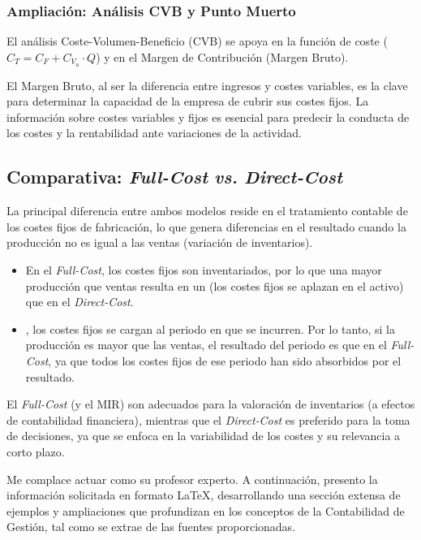 \subsubsection{Ampliación: Análisis CVB y Punto Muerto}

El análisis Coste-Volumen-Beneficio (CVB) se apoya en la función de coste ($C_T = C_F + C_{V_u} \cdot Q$) y en el Margen de Contribución (Margen Bruto).

El Margen Bruto, al ser la diferencia entre ingresos y costes variables, es la clave para determinar la capacidad de la empresa de cubrir sus costes fijos. La información sobre costes variables y fijos es esencial para predecir la conducta de los costes y la rentabilidad ante variaciones de la actividad.

\subsection{Comparativa: \textit{Full-Cost} \textit{vs.} \textit{Direct-Cost}}

La principal diferencia entre ambos modelos reside en el tratamiento contable de los costes fijos de fabricación, lo que genera diferencias en el resultado cuando la producción no es igual a las ventas (variación de inventarios).

\begin{itemize}
    \item {} En el \textit{Full-Cost}, los costes fijos son inventariados, por lo que una mayor producción que ventas resulta en un  (los costes fijos se aplazan en el activo) que en el \textit{Direct-Cost}.
    \item {}, los costes fijos se cargan al periodo en que se incurren. Por lo tanto, si la producción es mayor que las ventas, el resultado del periodo es  que en el \textit{Full-Cost}, ya que todos los costes fijos de ese periodo han sido absorbidos por el resultado.
\end{itemize}

El \textit{Full-Cost} (y el MIR) son adecuados para la valoración de inventarios (a efectos de contabilidad financiera), mientras que el \textit{Direct-Cost} es preferido para la toma de decisiones, ya que se enfoca en la variabilidad de los costes y su relevancia a corto plazo.

Me complace actuar como su profesor experto. A continuación, presento la información solicitada en formato LaTeX, desarrollando una sección extensa de ejemplos y ampliaciones que profundizan en los conceptos de la Contabilidad de Gestión, tal como se extrae de las fuentes proporcionadas.



